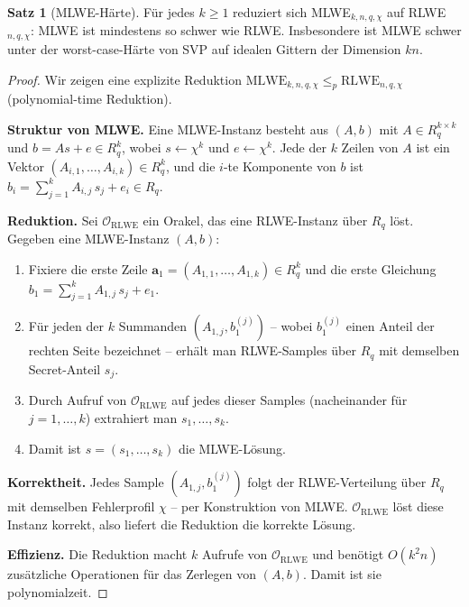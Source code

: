 ﻿\documentclass[a4paper,12pt]{article}
\theoremstyle{definition}
\newtheorem{satz}{Satz}[section]
\begin{document}
\begin{satz}[MLWE-Härte]
Für jedes $k \geq 1$ reduziert sich MLWE$_{k,n,q,\chi}$ auf RLWE$_{n,q,\chi}$:
MLWE ist mindestens so schwer wie RLWE. Insbesondere ist MLWE schwer unter der
worst-case-Härte von SVP auf idealen Gittern der Dimension $kn$.
\end{satz}

\begin{proof}
Wir zeigen eine explizite Reduktion $\mathrm{MLWE}_{k,n,q,\chi}
\leq_p \mathrm{RLWE}_{n,q,\chi}$ (polynomial-time Reduktion).

\textbf{Struktur von MLWE.}
Eine MLWE-Instanz besteht aus $(A, b)$ mit
$A \in R_q^{k \times k}$ und $b = As + e \in R_q^k$,
wobei $s \leftarrow \chi^k$ und $e \leftarrow \chi^k$.
Jede der $k$ Zeilen von $A$ ist ein Vektor $(A_{i,1},\ldots,A_{i,k}) \in R_q^k$,
und die $i$-te Komponente von $b$ ist
$b_i = \sum_{j=1}^k A_{i,j}\,s_j + e_i \in R_q$.

\textbf{Reduktion.}
Sei $\mathcal{O}_\mathrm{RLWE}$ ein Orakel, das eine RLWE-Instanz über $R_q$ löst.
Gegeben eine MLWE-Instanz $(A, b)$:

\begin{enumerate}
\item Fixiere die erste Zeile $\mathbf{a}_1 = (A_{1,1}, \ldots, A_{1,k}) \in R_q^k$
  und die erste Gleichung $b_1 = \sum_{j=1}^k A_{1,j}\,s_j + e_1$.

\item Für jeden der $k$ Summanden $(A_{1,j}, b_1^{(j)})$ -- wobei $b_1^{(j)}$
  einen Anteil der rechten Seite bezeichnet -- erhält man RLWE-Samples
  über $R_q$ mit demselben Secret-Anteil $s_j$.

\item Durch Aufruf von $\mathcal{O}_\mathrm{RLWE}$ auf jedes dieser Samples
  (nacheinander für $j = 1,\ldots,k$) extrahiert man $s_1,\ldots,s_k$.

\item Damit ist $s = (s_1,\ldots,s_k)$ die MLWE-Lösung.
\end{enumerate}

\textbf{Korrektheit.}
Jedes Sample $(A_{1,j}, b_1^{(j)})$ folgt der RLWE-Verteilung über $R_q$
mit demselben Fehlerprofil $\chi$ -- per Konstruktion von MLWE.
$\mathcal{O}_\mathrm{RLWE}$ löst diese Instanz korrekt, also liefert die
Reduktion die korrekte Lösung.

\textbf{Effizienz.}
Die Reduktion macht $k$ Aufrufe von $\mathcal{O}_\mathrm{RLWE}$ und benötigt
$O(k^2 n)$ zusätzliche Operationen für das Zerlegen von $(A, b)$.
Damit ist sie polynomialzeit.


\end{proof}
\end{document}
